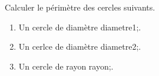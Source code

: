 \documentclass[exercice]{thedocument}%
\begin{document}
%
\smallskip\par\noindent Calculer le périmètre des cercles suivants.
\begin{enumerate}
    \item Un cercle de diamètre \<diametre1;.
    \item Un cerlce de diamètre \<diametre2;.
    \item Un cercle de rayon \<rayon;.
\end{enumerate}
\end{document}
